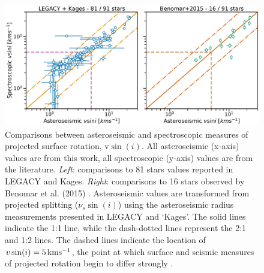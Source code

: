  
 \begin{figure}[h!]
 	\centering
 	\includegraphics[width=\textwidth]{Images/vsini_comparison_new.pdf}
 	\caption{Comparisons between asteroseismic and spectroscopic measures of projected surface rotation, $\textrm{v}\sin(i)$. All asteroseismic (x-axis) values are from this work, all spectroscopic (y-axis) values are from the literature. \textit{Left}: comparisons to 81 stars values reported in LEGACY and Kages. \textit{Right}: comparisons to 16 stars observed by Benomar et al. (2015) \cite{m_benomar+2015}. Asteroseismic values are transformed from projected splitting ($\nu_s\sin(i)$) using the asteroseismic radius measurements presented in LEGACY and `Kages'. The solid lines indicate the 1:1 line, while the dash-dotted lines represent the 2:1 and 1:2 lines. The dashed lines indicate the location of $v\sin(i) = 5\, \rm{kms^{-1}}$, the point at which surface and seismic measures of projected rotation begin to differ strongly \cite{m_tayar+2015}.}
 	\label{fig:vsinilit}
 \end{figure}


 